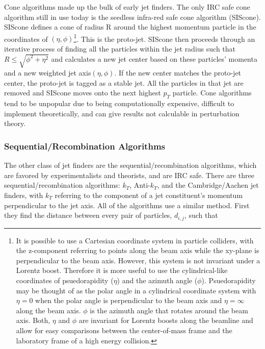 Cone algorithms made up the bulk of early jet finders.  The only IRC safe cone algorithm still in use today is the seedless infra-red safe cone algorithm (SIScone).  SIScone defines a cone of radius R around the highest momentum particle in the coordinates of $(\eta,\phi)$\footnote{It is possible to use a Cartesian coordinate system in particle colliders, with the z-component referring to points along the beam axis while the xy-plane is perpendicular to the beam axis.  However, this system is not invariant under a Lorentz boost.  Therefore it is more useful to use the cylindrical-like coordinates of psuedorapidity ($\eta$) and the azimuth angle ($\phi$). Psuedorapidity may be thought of as the polar angle in a cylindrical coordinate system with $\eta = 0$ when the polar angle is perpendicular to the beam axis and $\eta = \infty$ along the beam axis.  $\phi$ is the azimuth angle that rotates around the beam axis.  Both, $\eta$ and $\phi$ are invariant for Lorentz boosts along the beamline and allow for easy comparisons between the center-of-mass frame and the laboratory frame of a high energy collision.}.  This is the proto-jet.  SIScone then proceeds through an iterative process of finding all the particles within the jet radius such that $R \leq \sqrt{\phi^{2} + \eta^{2}}$ and calculates a new jet center based on these particles' momenta and a new weighted jet axis$(\eta,\phi)$.  If the new center matches the proto-jet center, the proto-jet is tagged as a stable jet.  All the particles in that jet are removed and SIScone moves onto the next highest $p_{T}$ particle.  Cone algorithms tend to be unpopular due to being computationally expensive, difficult to implement theoretically, and can give results not calculable in perturbation theory.

\subsubsection{Sequential/Recombination Algorithms}

The other class of jet finders are the sequential/recombination algorithms, which are favored by experimentalists and theorists, and are IRC safe.  There are three sequential/recombination algorithms: $k_{T}$, Anti-$k_{T}$, and the Cambridge/Aachen jet finders, with $k_{T}$ referring to the component of a jet constituent's momentum perpendicular to the jet axis.  All of the algorithms use a similar method.  First they find the distance between every pair of particles, $d_{i,j}$,  such that



